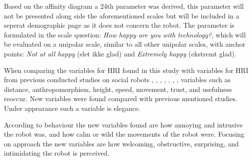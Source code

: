 \noindent
%
Based on the affinity diagram a 24th parameter was derived, this parameter will not be presented along side the aforementioned scales but will be included in a seperat demographic page as it does not concern the robot. The parameter is formulated in the scale question: \textit{How happy are you with technology?}, which will be evaluated on a unipolar scale, similar to all other unipolar scales, with anchor points: \textit{Not at all happy} (slet ikke glad) and \textit{Extremely happy} (ekstremt glad).  

When comparing the variables for HRI found in this study with variables for HRI from previous conducted studies on social robots \cite{PDF:ExploringInfluencingVariable}, \cite{PDF:SharingALifeHarvey}, \cite{PDF:InTheCompanyofRobots}, \cite{PDF:CloseButNotStuck}, \cite{PDF:TheImpactOfTraveler}, \cite{PDF:HumanRobotEmodiedInteraction}, \cite{PDF:RecommendationEffects}, variables such as distance, anthropomorphism, height, speed, movement, trust, and usefulness reoccur. New variables were found compared with previous mentioned studies. Under appearance such a variable is elegance. 

 According to behaviour the new variables found are how annoying and intrusive the robot was, and how calm or wild the movements of the robot were. Focusing on approach the new variables are how welcoming, obstructive, surprising, and intimidating the robot is perceived. 
 
  




